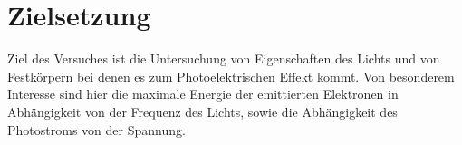 \section{Zielsetzung}

Ziel des Versuches ist die Untersuchung von Eigenschaften des Lichts und von Festkörpern bei denen es zum Photoelektrischen Effekt kommt. Von besonderem Interesse sind hier die
maximale Energie der emittierten Elektronen in Abhängigkeit von der Frequenz des Lichts, sowie die Abhängigkeit des Photostroms von der Spannung.


